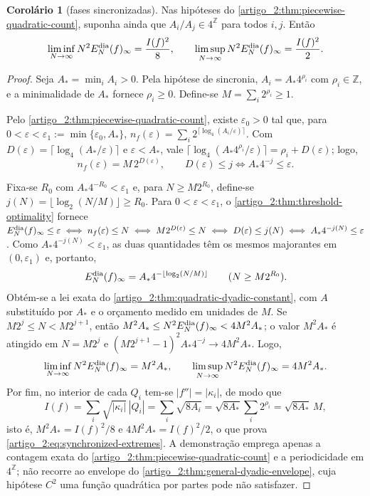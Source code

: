 \documentclass[12pt,a4paper]{article}
\theoremstyle{preciso}
\theoremstyle{definition}
\theoremstyle{preciso}
\theoremstyle{preciso}
\theoremstyle{preciso}
\theoremstyle{preciso}
\newtheorem{corollary}[teorema]{Corolário}
\theoremstyle{definition}
\theoremstyle{preciso}
\theoremstyle{definition}
\theoremstyle{preciso}
\theoremstyle{preciso}
\theoremstyle{definition}
\begin{document}
\begin{corollary}[fases sincronizadas]\label{map:artigo_2:12.3}
\label{artigo_2:cor:synchronized-phases}
Nas hipóteses do \cref{artigo_2:thm:piecewise-quadratic-count}, suponha ainda que
$A_i/A_j\in4^{\mathbb Z}$ para todos $i,j$. Então
\begin{equation}
 \liminf_{N\to\infty}N^2E_N^{\rm dia}(f)_\infty=\frac{I(f)^2}{8},
 \qquad
 \limsup_{N\to\infty}N^2E_N^{\rm dia}(f)_\infty=\frac{I(f)^2}{2}.
 \label{artigo_2:eq:synchronized-extremes}
\end{equation}
\end{corollary}

\begin{proof}
Seja $A_\ast=\min_iA_i>0$. Pela hipótese de sincronia, $A_i=A_\ast4^{\rho_i}$ com
$\rho_i\in\mathbb Z$, e a minimalidade de $A_\ast$ fornece $\rho_i\ge0$. Define-se
$M=\sum_i2^{\rho_i}\ge1$.

Pelo \cref{artigo_2:thm:piecewise-quadratic-count}, existe $\varepsilon_0>0$ tal que,
para $0<\varepsilon<\varepsilon_1:=\min\{\varepsilon_0,A_\ast\}$,
$n_f(\varepsilon)=\sum_i2^{\lceil\log_4(A_i/\varepsilon)\rceil}$. Com
$D(\varepsilon)=\lceil\log_4(A_\ast/\varepsilon)\rceil$ e $\varepsilon<A_\ast$, vale
$\lceil\log_4(A_\ast4^{\rho_i}/\varepsilon)\rceil=\rho_i+D(\varepsilon)$; logo,
\[
 n_f(\varepsilon)=M\,2^{D(\varepsilon)},
 \qquad
 D(\varepsilon)\le j\iff A_\ast4^{-j}\le\varepsilon .
\]

Fixa-se $R_0$ com $A_\ast4^{-R_0}<\varepsilon_1$ e, para $N\ge M2^{R_0}$, define-se
$j(N)=\lfloor\log_2(N/M)\rfloor\ge R_0$. Para $0<\varepsilon<\varepsilon_1$, o
\cref{artigo_2:thm:threshold-optimality} fornece
$E_N^{\rm dia}(f)_\infty\le\varepsilon\iff n_f(\varepsilon)\le N\iff
M2^{D(\varepsilon)}\le N\iff D(\varepsilon)\le j(N)\iff A_\ast4^{-j(N)}\le\varepsilon$.
Como $A_\ast4^{-j(N)}<\varepsilon_1$, as duas quantidades têm os mesmos majorantes
em $(0,\varepsilon_1)$ e, portanto,
\[
 E_N^{\rm dia}(f)_\infty=A_\ast4^{-\lfloor\log_2(N/M)\rfloor}
 \qquad(N\ge M2^{R_0}).
\]
Obtém-se a lei exata do \cref{artigo_2:thm:quadratic-dyadic-constant}, com $A$ substituído
por $A_\ast$ e o orçamento medido em unidades de $M$. Se
$M2^j\le N<M2^{j+1}$, então $M^2A_\ast\le N^2E_N^{\rm dia}(f)_\infty<4M^2A_\ast$;
o valor $M^2A_\ast$ é atingido em $N=M2^j$ e
$(M2^{j+1}-1)^2A_\ast4^{-j}\to4M^2A_\ast$. Logo,
\[
 \liminf_{N\to\infty}N^2E_N^{\rm dia}(f)_\infty=M^2A_\ast,
 \qquad
 \limsup_{N\to\infty}N^2E_N^{\rm dia}(f)_\infty=4M^2A_\ast .
\]
Por fim, no interior de cada $Q_i$ tem-se $|f''|=|\kappa_i|$, de modo que
\[
 I(f)=\sum_i\sqrt{|\kappa_i|}\,|Q_i|=\sum_i\sqrt{8A_i}
 =\sqrt{8A_\ast}\sum_i2^{\rho_i}=\sqrt{8A_\ast}\,M,
\]
isto é, $M^2A_\ast=I(f)^2/8$ e $4M^2A_\ast=I(f)^2/2$, o que prova
\eqref{artigo_2:eq:synchronized-extremes}. A demonstração emprega apenas a contagem
exata do \cref{artigo_2:thm:piecewise-quadratic-count} e a periodicidade em
$4^{\mathbb Z}$; não recorre ao envelope do
\cref{artigo_2:thm:general-dyadic-envelope}, cuja hipótese $C^2$ uma função quadrática por
partes pode não satisfazer.
\end{proof}
\end{document}
